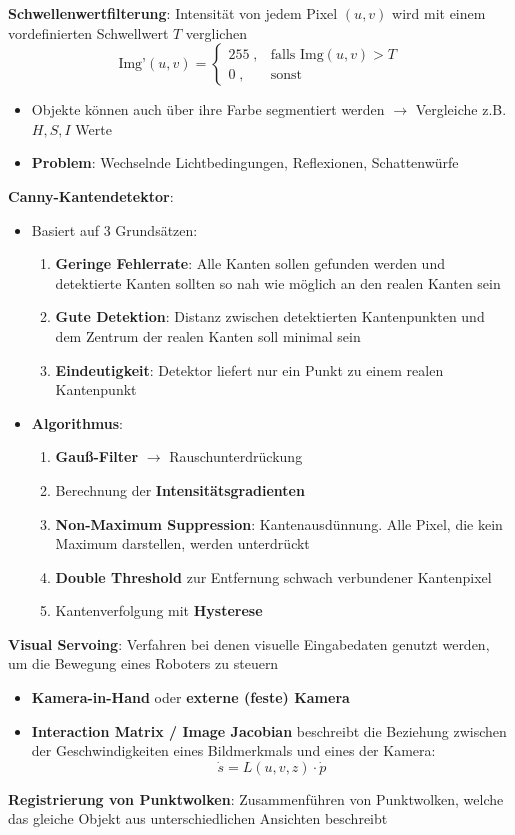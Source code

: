 \textbf{Schwellenwertfilterung}: Intensität von jedem Pixel $(u,v)$ wird mit einem vordefinierten Schwellwert $T$ verglichen
$$\text{Img'}(u,v)=\begin{cases}
	255\;, & \text{falls Img}(u,v)>T\\
	0\;, & \text{sonst}
\end{cases}$$
\begin{itemize}
	\item Objekte können auch über ihre Farbe segmentiert werden $\rightarrow$ Vergleiche z.B. $H,S,I$ Werte
	\item \textbf{Problem}: Wechselnde Lichtbedingungen, Reflexionen, Schattenwürfe
\end{itemize}
\bigskip
\textbf{Canny-Kantendetektor}:
\begin{itemize}
	\item Basiert auf 3 Grundsätzen:
	\begin{enumerate}
		\item \textbf{Geringe Fehlerrate}: Alle Kanten sollen gefunden werden und detektierte Kanten sollten so nah wie möglich an den realen Kanten sein
		\item \textbf{Gute Detektion}: Distanz zwischen detektierten Kantenpunkten und dem Zentrum der realen Kanten soll minimal sein
		\item \textbf{Eindeutigkeit}: Detektor liefert nur ein Punkt zu einem realen Kantenpunkt
	\end{enumerate}
	\item \textbf{Algorithmus}:
	\begin{enumerate}
		\item \textbf{Gauß-Filter} $\rightarrow$ Rauschunterdrückung
		\item Berechnung der \textbf{Intensitätsgradienten}
		\item \textbf{Non-Maximum Suppression}: Kantenausdünnung. Alle Pixel, die kein Maximum darstellen, werden unterdrückt
		\item \textbf{Double Threshold} zur Entfernung schwach verbundener Kantenpixel
		\item Kantenverfolgung mit \textbf{Hysterese}
	\end{enumerate}
\end{itemize}

\textbf{Visual Servoing}: Verfahren bei denen visuelle Eingabedaten genutzt werden, um die Bewegung eines Roboters zu steuern
\begin{itemize}
	\item \textbf{Kamera-in-Hand} oder \textbf{externe (feste) Kamera}
	\item \textbf{Interaction Matrix / Image Jacobian} beschreibt die Beziehung zwischen der Geschwindigkeiten eines Bildmerkmals und eines der Kamera:
	$$\dot{s}=L(u,v,z)\cdot\dot{p}$$
\end{itemize}
\bigskip
\textbf{Registrierung von Punktwolken}: Zusammenführen von Punktwolken, welche das gleiche Objekt aus unterschiedlichen Ansichten beschreibt

